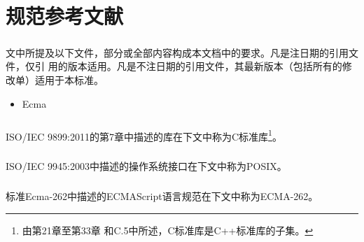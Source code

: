 \chapter{规范参考文献}
\paragraph{}
文中所提及以下文件，部分或全部内容构成本文档中的要求。凡是注日期的引用文件，仅引
用的版本适用。凡是不注日期的引用文件，其最新版本（包括所有的修改单）适用于本标准。
\begin{itemize}
  \item Ecma
\end{itemize}

\paragraph{}
ISO/IEC 9899:2011的第7章中描述的库在下文中称为C标准库\footnote{由第21章至第33章
和C.5中所述，C标准库是C++标准库的子集。}。

\paragraph{}
ISO/IEC 9945:2003中描述的操作系统接口在下文中称为POSIX。

\paragraph{}
标准Ecma-262中描述的ECMAScript语言规范在下文中称为ECMA-262。

